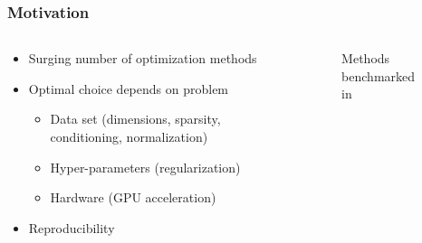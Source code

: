 \documentclass[10pt]{beamer}
\begin{document}
\begin{frame}
  \frametitle{Motivation}
  \begin{columns}[c]
    \begin{column}{0.45\textwidth}
      \begin{itemize}[<+->]
        \item Surging number of optimization methods
        \item Optimal choice depends on problem
              \begin{itemize}
                \item Data set (dimensions, sparsity, conditioning, normalization)
                \item Hyper-parameters (regularization)
                \item Hardware (GPU acceleration)
              \end{itemize}
        \item Reproducibility
      \end{itemize}
    \end{column}
    \begin{column}{0.45\textwidth}
      \begin{figure}[htpb]
        \centering
        \caption{%
          Methods benchmarked in \textcite{schmidt2021}
        }
      \end{figure}

    \end{column}
  \end{columns}
\end{frame}
\end{document}
